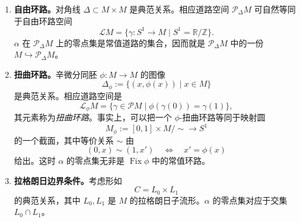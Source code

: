 \begin{example}\label{ex:canonical-relations}
\begin{enumerate}[label=(\roman*)]
\item \textbf{自由环路。}对角线 $\Delta\subset M\times M$ 是典范关系。相应道路空间 $\mathcal P_\Delta M$ 可自然等同于自由环路空间
\[
 \mathcal LM=\{\gamma:S^1\to M\mid S^1=\mathbb R/\mathbb Z\}.
\]
$\alpha$ 在 $\mathcal P_\Delta M$ 上的零点集是常值道路的集合，因而就是
$\mathcal P_\Delta M$ 中的一份 $M\hookrightarrow\mathcal P_\Delta M$。

\item \textbf{扭曲环路。}辛微分同胚 $\phi:M\to M$ 的图像
\[
 \Delta_\phi:=\{(x,\phi(x))\mid x\in M\}
\]
是典范关系。相应道路空间是
\[
 \mathcal L_\phi M
 =\{\gamma\in\mathcal PM\mid\phi(\gamma(0))=\gamma(1)\},
\]
其元素称为\emph{扭曲环路}。事实上，可以把一个 $\phi$-扭曲环路等同于映射圆
\[
 M_\phi:=[0,1]\times M/{\sim}\longrightarrow S^1
\]
的一个截面，其中等价关系 $\sim$ 由
\[
 (0,x)\sim(1,x')\quad\Longleftrightarrow\quad x'=\phi(x)
\]
给出。这时 $\alpha$ 的零点集无非是 $\operatorname{Fix}\phi$ 中的常值环路。

\item \textbf{拉格朗日边界条件。}考虑形如
\[
 C=L_0\times L_1
\]
的典范关系，其中 $L_0,L_1$ 是 $M$ 的拉格朗日子流形。$\alpha$ 的零点集对应于交集 $L_0\cap L_1$。
\end{enumerate}
\end{example}
